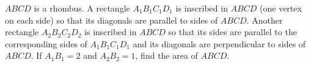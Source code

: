 $ABCD$ is a rhombus. A rectangle $A_1B_1C_1D_1$ is inscribed in $ABCD$ (one vertex on each side) so that its diagonals are parallel to sides of $ABCD$. Another rectangle $A_2B_2C_2D_2$ is inscribed in $ABCD$ so that its sides are parallel to the corresponding sides of $A_1B_1C_1D_1$ and its diagonals are perpendicular to sides of $ABCD$. If $A_1B_1=2$ and $A_2B_2=1$, find the area of $ABCD$.
